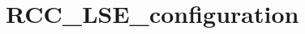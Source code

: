 \hypertarget{group___r_c_c___l_s_e__configuration}{\section{R\-C\-C\-\_\-\-L\-S\-E\-\_\-configuration}
\label{group___r_c_c___l_s_e__configuration}
}
